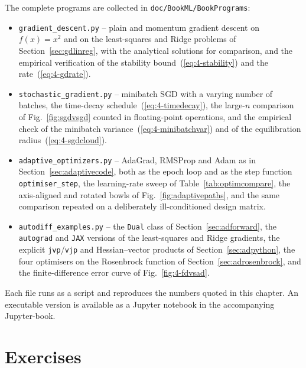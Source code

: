 The complete programs are collected in \texttt{doc/BookML/BookPrograms}:

\begin{itemize}
  \item \texttt{gradient\_descent.py} -- plain and momentum gradient descent on
        $f(x)=x^{2}$ and on the least-squares and Ridge problems of
        Section~\ref{sec:gdlinreg}, with the analytical solutions for
        comparison, and the empirical verification of the stability
        bound~(\ref{eq:4-stability}) and the rate~(\ref{eq:4-gdrate}).
  \item \texttt{stochastic\_gradient.py} -- minibatch SGD with a varying number
        of batches, the time-decay schedule~(\ref{eq:4-timedecay}), the
        large-$n$ comparison of Fig.~\ref{fig:sgdvsgd} counted in
        floating-point operations, and the empirical check of the minibatch
        variance~(\ref{eq:4-minibatchvar}) and of the equilibration
        radius~(\ref{eq:4-sgdcloud}).
  \item \texttt{adaptive\_optimizers.py} -- AdaGrad, RMSProp and Adam as in
        Section~\ref{sec:adaptivecode}, both as the epoch loop and as the
        step function \texttt{optimiser\_step}, the learning-rate sweep of
        Table~\ref{tab:optimcompare}, the axis-aligned and rotated bowls of
        Fig.~\ref{fig:adaptivepaths}, and the same comparison repeated on a
        deliberately ill-conditioned design matrix.
  \item \texttt{autodiff\_examples.py} -- the \texttt{Dual} class of
        Section~\ref{sec:adforward}, the \texttt{autograd} and \texttt{JAX}
        versions of the least-squares and Ridge gradients, the explicit
        \texttt{jvp}/\texttt{vjp} and Hessian--vector products of
        Section~\ref{sec:adpython}, the four optimisers on the Rosenbrock
        function of Section~\ref{sec:adrosenbrock}, and the finite-difference
        error curve of Fig.~\ref{fig:4-fdvsad}.
\end{itemize}

Each file runs as a script and reproduces the numbers quoted in this chapter.
An executable version is available as a Jupyter notebook in the accompanying
Jupyter-book.

\section{Exercises}
\label{sec:ch4exercises}

